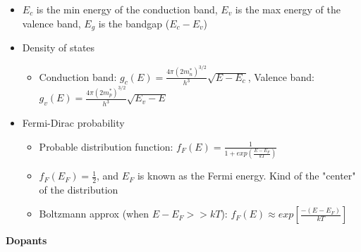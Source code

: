\documentclass{article}
\begin{document}
\begin{itemize}
    \item $E_c$ is the min energy of the conduction band, $E_v$ is the max energy of the valence band, $E_g$ is the bandgap ($E_c - E_v$)
    \item Density of states
    \begin{itemize}
        \item Conduction band: $g_c(E) = \frac{4 \pi (2m_n^*)^{3/2}}{h^3} \sqrt{E - E_c}$, Valence band: $g_v(E) = \frac{4 \pi (2m_p^*)^{3/2}}{h^3} \sqrt{E_v - E}$
    \end{itemize}
    \item Fermi-Dirac probability
    \begin{itemize}
        \item Probable distribution function: $f_F(E) = \frac{1}{1 + exp\left(\frac{E - E_F}{kT}\right)}$
        \item $f_F(E_F) = \frac{1}{2}$, and $E_F$ is known as the Fermi energy. Kind of the "center" of the distribution
        \item Boltzmann approx (when $E - E_F >> kT$): $f_F(E) \approx exp\left[\frac{-(E - E_F)}{kT}\right]$
    \end{itemize}
\end{itemize}
\textbf{Dopants}
\end{document}
